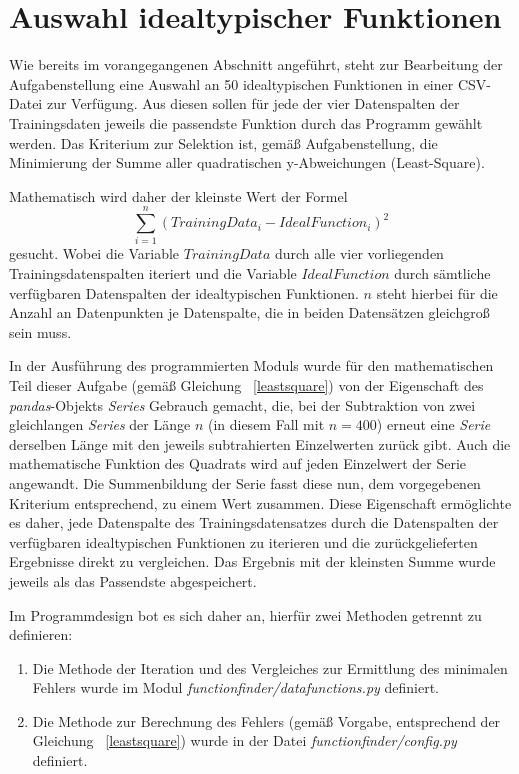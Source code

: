 \section{Auswahl idealtypischer Funktionen}

Wie bereits im vorangegangenen Abschnitt angeführt, steht zur Bearbeitung der Aufgabenstellung eine Auswahl an 50 idealtypischen Funktionen in einer CSV-Datei zur Verfügung. Aus diesen sollen für jede der vier Datenspalten der Trainingsdaten jeweils die passendste Funktion durch das Programm gewählt werden. Das Kriterium zur Selektion ist, gemäß Aufgabenstellung, die Minimierung der Summe aller quadratischen y-Abweichungen (Least-Square).

Mathematisch wird daher der kleinste Wert der Formel
\begin{equation}  
\sum_{i=1}^{n}(TrainingData_{i} - IdealFunction_{i})^2
\label{leastsquare}
\end{equation}
gesucht. Wobei die Variable $TrainingData$ durch alle vier vorliegenden Trainingsdatenspalten iteriert und die Variable $IdealFunction$ durch sämtliche verfügbaren Datenspalten der idealtypischen Funktionen. $n$ steht hierbei für die Anzahl an Datenpunkten je Datenspalte, die in beiden Datensätzen gleichgroß sein muss. 

In der Ausführung des programmierten Moduls wurde für den mathematischen Teil dieser Aufgabe (gemäß Gleichung ~\ref{leastsquare})  von der Eigenschaft des \emph{pandas}-Objekts \emph{Series} Gebrauch gemacht, die, bei der Subtraktion von zwei gleichlangen \emph{Series} der Länge $n$ (in diesem Fall mit $n=400$) erneut eine \emph{Serie} derselben Länge mit den jeweils subtrahierten Einzelwerten zurück gibt. Auch die mathematische Funktion des Quadrats wird auf jeden Einzelwert der Serie angewandt. Die Summenbildung der Serie fasst diese nun, dem vorgegebenen Kriterium entsprechend, zu einem Wert zusammen.
Diese Eigenschaft ermöglichte es daher, jede Datenspalte des Trainingsdatensatzes durch die Datenspalten der verfügbaren idealtypischen Funktionen zu iterieren und die zurückgelieferten Ergebnisse direkt zu vergleichen. Das Ergebnis mit der kleinsten Summe wurde jeweils als das Passendste abgespeichert.

Im Programmdesign bot es sich daher an, hierfür zwei Methoden getrennt zu definieren:
\begin{enumerate}
 \itemsep0pt
 \item Die Methode der Iteration und des Vergleiches zur Ermittlung des minimalen Fehlers wurde im Modul \emph{functionfinder/datafunctions.py} definiert.
 \item Die Methode zur Berechnung des Fehlers (gemäß Vorgabe, entsprechend der Gleichung ~\ref{leastsquare}) wurde in der Datei \emph{functionfinder/config.py} definiert.
\end{enumerate}

